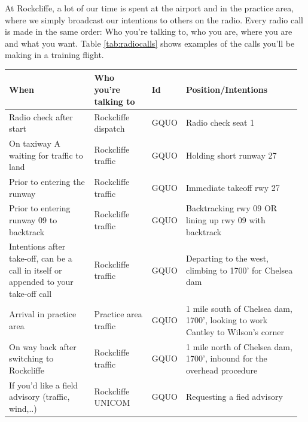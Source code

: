 \documentclass[12pt,letterpaper]{article}
\begin{document}
    At Rockcliffe, a lot of our time is spent at the airport and in the practice area, where we simply broadcast our intentions to others on the radio. Every radio call is made in the same order: Who you’re talking to, who you are, where you are and what you want. Table \ref{tab:radiocalls} shows examples of the calls you’ll be making in a training flight.

    \begin{table}[]
    \hspace*{-1cm}
        \begin{tabular}{| p{0.30\linewidth} |  p{0.20\linewidth} | p{0.07\linewidth} |  p{0.40\linewidth} |}
        \hline
         When & Who you're talking to & Id & Position/Intentions\\
        \hline
     
        Radio check after start & Rockcliffe dispatch & GQUO & Radio check seat 1\\
        \hline
        
        On taxiway A waiting for traffic to land & Rockcliffe traffic & GQUO & Holding short runway 27\\
        \hline
        
        Prior to entering the runway & Rockcliffe traffic & GQUO & Immediate takeoff rwy 27\\
        \hline
        
        Prior to entering runway 09 to backtrack & Rockcliffe traffic & GQUO & Backtracking rwy 09 OR lining up rwy 09 with backtrack\\
        \hline

        Intentions after take-off, can be a call in itself or appended to your take-off call & Rockcliffe traffic & GQUO & Departing to the west, climbing to 1700’ for Chelsea dam\\
        \hline
        
        Arrival in practice area & Practice area traffic & GQUO & 1 mile south of Chelsea dam, 1700’, looking to work Cantley to Wilson’s corner\\
        \hline
        
        On way back after switching to Rockcliffe & Rockcliffe traffic & GQUO & 1 mile north of Chelsea dam, 1700’, inbound for the overhead procedure\\
        \hline
        
        If you’d like a field advisory (traffic, wind,..) & Rockcliffe UNICOM & GQUO & Requesting a fied advisory\\
        \hline
        

\end{tabular}
\end{table}
\end{document}
